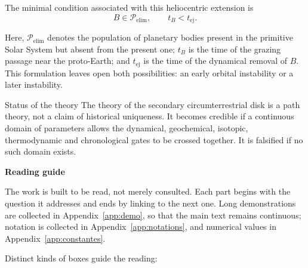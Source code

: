 \documentclass[11pt,a4paper,openany]{report}
\begin{document}
The minimal condition associated with this heliocentric extension is
\begin{equation}
\boxed{
B\in\mathcal{P}_{\mathrm{elim}},
\qquad
 t_B<t_{\mathrm{ej}} .
}
\label{eq:B-elim-preamble}
\end{equation}

Here, $\mathcal{P}_{\mathrm{elim}}$ denotes the population of planetary bodies
present in the primitive Solar System but absent from the present one; $t_B$ is
the time of the grazing passage near the proto-Earth; and $t_{\mathrm{ej}}$ is
the time of the dynamical removal of $B$. This formulation leaves open both
possibilities: an early orbital instability or a later instability.

\begin{principe}{Status of the theory}
The theory of the secondary circumterrestrial disk is a path theory, not a
claim of historical uniqueness. It becomes credible if a continuous domain of
parameters allows the dynamical, geochemical, isotopic, thermodynamic and
chronological gates to be crossed together. It is falsified if no such domain
exists.
\end{principe}

\clearpage
\thispagestyle{plain}
\begin{center}{\Large\bfseries Reading guide}\end{center}
\medskip

The work is built to be read, not merely consulted. Each part begins with the question it
addresses and ends by linking to the next one. Long demonstrations are collected in
Appendix~\ref{app:demo}, so that the main text remains continuous; notation is collected in
Appendix~\ref{app:notations}, and numerical values in Appendix~\ref{app:constantes}.

Distinct kinds of boxes guide the reading:
\end{document}
